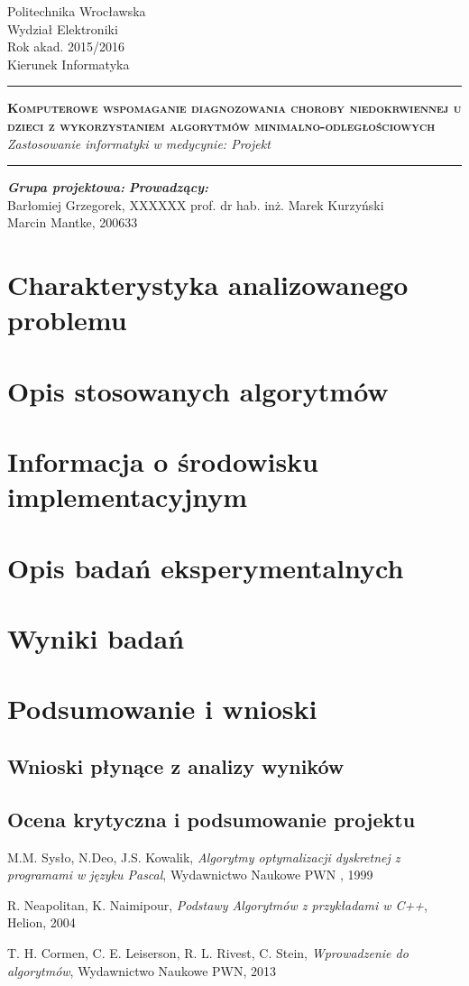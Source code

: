 \documentclass[11pt, a4paper, titlepage]{report}
\date{Wrocław, 06.06.2016}
\makeatletter
\renewcommand{\maketitle}{\begin{titlepage}
		\begin{center}\small
			Politechnika Wrocławska\\
			Wydział Elektroniki\\
			Rok akad. 2015/2016\\
			Kierunek Informatyka\\
			\vspace{3cm}
			\rule{\linewidth}{0.4pt}
				\huge \textsc{\textbf{Komputerowe wspomaganie diagnozowania choroby niedokrwiennej u dzieci z wykorzystaniem algorytmów minimalno-odległościowych}}
				\vspace{0.5cm} \\
				\normalsize \textit{Zastosowanie informatyki w medycynie: Projekt}
			\rule{\linewidth}{0.4pt}
		\end{center}

		\vspace{3cm}
		\begin{flushleft}
			\textbf{\textit{Grupa projektowa:}} \hspace{6.5cm} \textbf{\textit{Prowadzący:}} \\
			Barłomiej Grzegorek, XXXXXX \hfill{prof. dr hab. inż. Marek Kurzyński} \\
			Marcin Mantke, 200633\\
			\vspace{2cm}
		\end{flushleft}
		\vspace*{\stretch{6}}
		\begin{center}
			\@date
		\end{center}
	\end{titlepage}%
}
\makeatother
\begin{document}
\maketitle
\tableofcontents
\cleardoublepage
{}
{}
\listoffigures

\cleardoublepage
{}
{}
\lstlistoflistings
\chapter{Charakterystyka analizowanego problemu}
\label{chap:Charakterystyka analizowanego problemu}

\chapter{Opis stosowanych algorytmów}
\label{chap:Opis stosowanych algorytmów}

\chapter{Informacja o środowisku implementacyjnym}
\label{chap:Informacja o środowisku implementacyjnym}

\chapter{Opis badań eksperymentalnych}
\label{chap:Opis badań eksperymentalnych}

\chapter{Wyniki badań}
\label{chap:Wyniki badań}

\chapter{Podsumowanie i wnioski}
\label{chap:Podsumowanie i wnioski}
\section{Wnioski płynące z analizy wyników}
\section{Ocena krytyczna i podsumowanie projektu}

\begin{thebibliography}{}
M.M. Sysło, N.Deo, J.S. Kowalik, \textit{Algorytmy optymalizacji dyskretnej z programami w języku Pascal}, Wydawnictwo Naukowe PWN , 1999

R. Neapolitan, K. Naimipour, \textit{Podstawy Algorytmów z przykładami w C++}, Helion, 2004

T. H. Cormen, C. E. Leiserson, R. L. Rivest, C. Stein, \textit{Wprowadzenie do algorytmów}, Wydawnictwo Naukowe PWN, 2013

\end{thebibliography}
\end{document}

